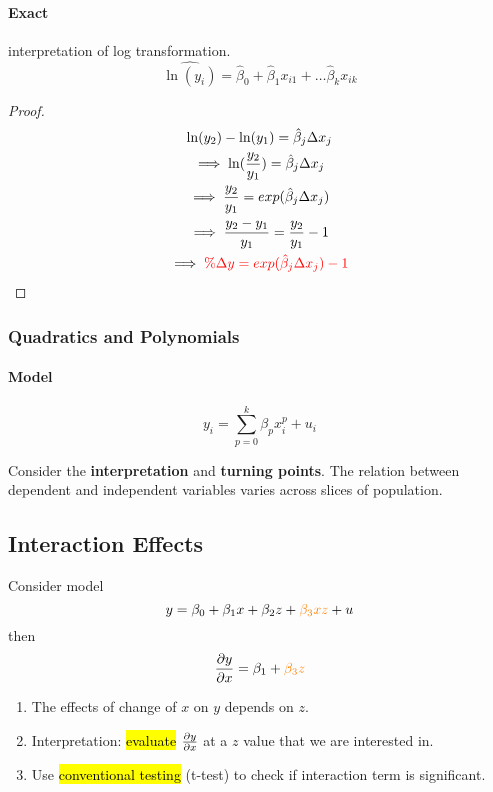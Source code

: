 \documentclass[]{article}
\begin{document}
    		\paragraph{Exact} interpretation of log transformation.
    			\[
    				\widehat{\ln(y_i)} = \hat{\beta}_0 + \hat{\beta}_1 x_{i1} + \dots \hat{\beta}_k x_{ik}
    			\]
    			\begin{proof}
	    			\begin{gather*}
	    				\ln(y_2) - \ln(y_1) = \hat{\beta}_j \Delta x_j \\
	    				\implies \ln(\frac{y_2}{y_1}) = \hat{\beta}_j \Delta x_j \\
	    				\implies \frac{y_2}{y_1} = exp(\hat{\beta}_j \Delta x_j) \\
	    				\implies \frac{y_2 - y_1}{y_1} 
	    				= \frac{y_2}{y_1} - 1 \\
	    				\implies \textcolor{red}{\%\Delta y= exp(\hat{\beta}_j \Delta x_j) - 1}
	    			\end{gather*}
    			\end{proof}
    	\subsubsection{Quadratics and Polynomials}
    		\paragraph{Model}
    			\[
    				y_i = \sum_{p=0}^k {\beta_p x_{i}^p} + u_i
    			\]
    		\begin{remark}
    			Consider the \textbf{interpretation} and \textbf{turning points}. The relation between dependent and independent variables varies across slices of population.
    		\end{remark}
    	\subsection{Interaction Effects}
    		\par Consider model
    		\[
    			y = \beta_0 + \beta_1 x + \beta_2 z + \textcolor{orange}{\beta_3 x z} + u
    		\]
    		then 
    		\[
    			\frac{\partial{y}}{\partial{x}} = \beta_1 + \textcolor{orange}{\beta_3 z}
    		\]
    		\begin{enumerate}
    			\item The effects of change of $x$ on $y$ depends on $z$.
    			\item Interpretation: \hl{evaluate} $\frac{\partial{y}}{\partial{x}}$ at a $z$ value that we are interested in.
    			\item Use \hl{conventional testing} (t-test) to check if interaction term is significant.
    		\end{enumerate}
\end{document}
